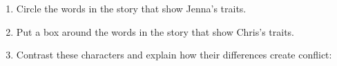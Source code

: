 \documentclass[12pt]{article}
\begin{document}
\begin{tcolorbox}[colframe=black!60, colback=white, 
coltitle=black, colbacktitle=black!15, fonttitle=\bfseries\Large, 
title=Guided Practice, halign title=center, left=10pt, right=10pt, top=10pt, bottom=15pt]

\begin{enumerate}[itemsep=1em]
    \item Circle the words in the story that show Jenna's traits.
    \item Put a box around the words in the story that show Chris's traits.
    \item Contrast these characters and explain how their differences create conflict:
    \\[0.8cm] \underline{\hspace{14cm}}  
    \\[0.8cm] \underline{\hspace{14cm}}  
    \\[0.8cm] \underline{\hspace{14cm}} 
\end{enumerate}
\end{tcolorbox}
\vspace{1em}
\end{document}
